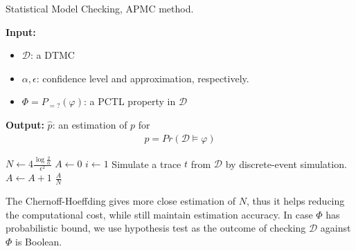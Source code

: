 \begin{algorithm}[H]
    \caption{Statistical Model Checking, APMC method.}
    \label{alg:smc-apmc}
    \hspace*{\algorithmicindent} \textbf{Input:}
    \begin{itemize}
        \item $\mathcal{D}$: a DTMC
        \item $\alpha, \epsilon$: confidence level and approximation, respectively.
        \item $\Phi = P_{=?}(\varphi) $: a PCTL property in $\mathcal{D}$
    \end{itemize}
    \hspace*{\algorithmicindent} \textbf{Output:} $\hat{p}$: an estimation of $p$ for
    \begin{align*}
        p = Pr(\mathcal{D} \models \varphi)
    \end{align*}
    \begin{algorithmic}[1]
        \State $N \leftarrow 4\frac{\log{\frac{2}{\alpha}}}{\epsilon^2}$
        \State $A \leftarrow 0$
        \State $i \leftarrow 1$
        \State Simulate a trace $t$ from $\mathcal{D}$ by discrete-event simulation.
        \State $A \leftarrow A + 1$
        \EndIf
        \EndWhile
        \Return $\frac{A}{N}$
        \EndProcedure
    \end{algorithmic}
\end{algorithm}
The Chernoff-Hoeffding gives more close estimation of $N$, thus it helps reducing the computational
cost, while still maintain estimation accuracy. In case $\Phi$ has probabilistic bound, we use
hypothesis test as the outcome of checking $\mathcal{D}$ against $\Phi$ is Boolean.

